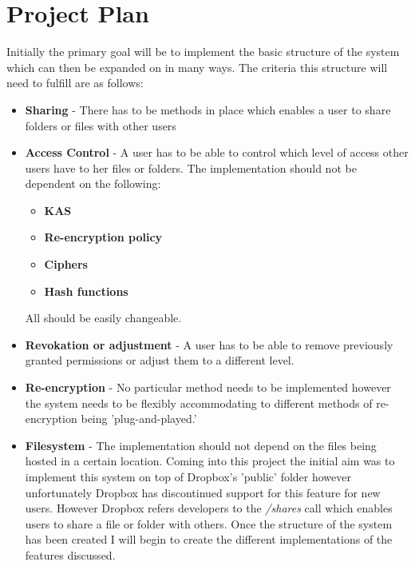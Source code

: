 \documentclass[10pt, titlepage]{article}
\begin{document}
\section{Project Plan}
Initially the primary goal will be to implement the basic structure of the system which can then be expanded on in many ways. The criteria this structure will need to fulfill are as follows:
\begin{itemize}
\item \textbf{Sharing} - There has to be methods in place which enables a user to share folders or files with other users
\item \textbf{Access Control} - A user has to be able to control which level of access other users have to her files or folders. The implementation should not be dependent on the following:
	\begin{itemize}
	\item \textbf{KAS}
	\item \textbf{Re-encryption policy}
	\item \textbf{Ciphers}
	\item \textbf{Hash functions}
	\end{itemize}
All should be easily changeable.
\item \textbf{Revokation or adjustment} - A user has to be able to remove previously granted permissions or adjust them to a different level.
\item \textbf{Re-encryption} - No particular method needs to be implemented however the system needs to be flexibly accommodating to different methods of re-encryption being 'plug-and-played.'
\item \textbf{Filesystem} - The implementation should not depend on the files being hosted in a certain location.
\newline Coming into this project the initial aim was to implement this system on top of Dropbox's 'public' folder however unfortunately Dropbox has discontinued support for this feature for new users.\cite{dropboxPublicFolder} However Dropbox refers developers to the \textit{/shares} call which enables users to share a file or folder with others.
\newline \indent Once the structure of the system has been created I will begin to create the different implementations of the features discussed.
\end{itemize}
\end{document}
